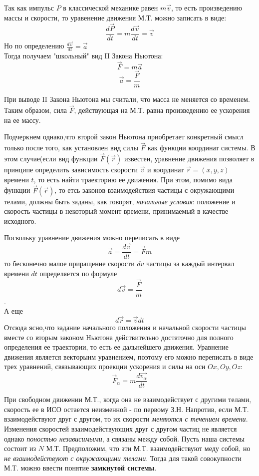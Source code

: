 \documentclass{article}
\begin{document}
Так как импульс $P$ в классической механике равен $m\vec v$, то есть произведению массы и скорости, то уравенение движения М.Т. можно записать в виде:
$$\frac {d\vec P} {dt} = m \frac{d\vec v}{dt} = \vec v$$
Но по определению $\frac{d\vec v}{dt} = \vec a$
\\
Тогда получаем "школьный" вид II Закона Ньютона:
$$\vec{F} = m \vec a$$
$$\vec a = \frac{\vec F}{m}$$

При выводе II Закона Ньютона мы считали, что масса не меняется со временем. Таким образом, сила $\vec F$, действующая на М.Т. равна произведению ее ускорения на ее массу.

Подчеркнем однако,что второй закон Ньютона приобретает конкретный смысл только после того, как установлен вид силы $\vec F$ как функции координат системы. В этом случае(если вид функции $\vec F(\vec r)$ известен, уравнение движения позволяет в принципе определить зависимость скорости $\vec v$ и координат $\vec r = (x,y,z)$ времени $t$, то есть найти траекторию ее движения. При этом, помимо вида функции $\vec F(\vec{r})$, то етсь законов взаимодействия частицы с окружающими телами, должны быть заданы, как говорят, \emph{начальные условия}: положение и скорость частицы в некоторый  момент времени, принимаемый в качестве исходного.

Поскольку уравнение движения можно переписать в виде 
$$\vec{a} = \frac{d\vec v}{dt} = \vec Fm$$
то бесконечно малое приращение скорости $dv$ частицы за каждый интервал времени $dt$ определяется по формуле $$d\vec v = \frac{\vec F} m$$.
\\
А еще
$$d\vec r =\vec v dt$$
Отсюда ясно,что задание начального положения и начальной скорости частицы вместе со вторым законом Ньютона действительно достаточно для полного определения ее траектории, то есть ее дальнейшего движения. Уравнение  движения является векторынм уравнением, поэтому его можно переписать в виде трех уравнений, связывающих проекции ускорения и силы на оси $Ox, Oy, Oz$:
$$\vec F_\alpha = m \frac{d \vec{v_\alpha}}{dt}$$

При свободном движении М.Т., когда она не взаимодействует с другими телами, скорость ее в ИСО остается неизменной - по первому З.Н. Напротив, если М.Т. взаимодействуют друг с другом, то их скорости \emph{меняются с течением времени}. Изменения скоростей взаимодействующих друг с другом частиц не является однако \emph{поностью независимыми}, а связаны между собой. Пусть наша системы состоит из $N$ М.Т. Предположим, что эти М.Т. взаимодействуют меду собой, но\emph{ не взаимодействуют с окружающими телами}. Тогда для такой совокупности М.Т. можно ввести понятие \textbf{замкнутой системы}. 
\end{document}
